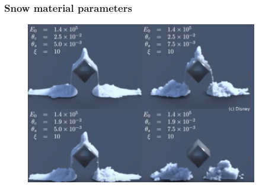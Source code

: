 \documentclass[notes]{beamer}
\begin{document}
\begin{frame}
	\frametitle{Snow material parameters}
	\begin{figure}[ht]
		\centering
		\includegraphics[width=0.9\textwidth]{figs/snow-parameters.png}
	\end{figure}
\end{frame}
\end{document}
